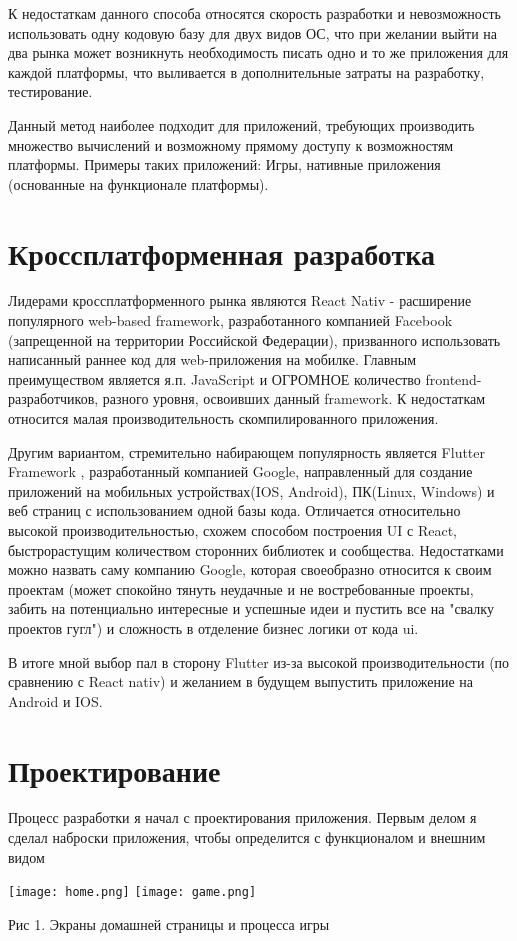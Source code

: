 \documentclass[14pt, oneside]{altsu-report}
\begin{document}
К недостаткам данного способа относятся скорость разработки и невозможность использовать одну кодовую базу для двух видов ОС, что при желании выйти на два рынка может возникнуть необходимость писать одно и то же приложения для каждой платформы, что выливается в дополнительные затраты на разработку, тестирование.

Данный метод наиболее подходит для приложений, требующих производить множество вычислений и возможному прямому доступу к возможностям платформы. Примеры таких приложений: Игры, нативные приложения (основанные на функционале платформы).

\section*{Кроссплатформенная разработка}
Лидерами кроссплатформенного рынка являются React Nativ \cite{react} - расширение популярного web-based framework, разработанного компанией Facebook (запрещенной на территории Российской Федерации), призванного использовать написанный раннее код для web-приложения на мобилке. Главным преимуществом является я.п. JavaScript и ОГРОМНОЕ количество frontend-разработчиков, разного уровня, освоивших данный framework. К недостаткам относится малая производительность скомпилированного приложения. 

Другим вариантом, стремительно набирающем популярность является Flutter Framework \cite{flutter}, разработанный компанией Google, направленный для создание приложений на мобильных устройствах(IOS, Android), ПК(Linux, Windows) и веб страниц с использованием одной базы кода. Отличается относительно высокой производительностью, схожем способом построения UI с React, быстрорастущим количеством сторонних библиотек и сообщества. Недостатками можно назвать саму компанию Google, которая своеобразно относится к своим проектам (может спокойно тянуть неудачные и не востребованные проекты, забить на потенциально интересные и успешные идеи и пустить все на "свалку проектов гугл") и сложность в отделение бизнес логики от кода ui.

В итоге мной выбор пал в сторону Flutter из-за высокой производительности (по сравнению с React nativ) и желанием в будущем выпустить приложение на Android и IOS.
\section{Проектирование}
Процесс разработки я начал с проектирования приложения. Первым делом я сделал наброски приложения, чтобы определится с функционалом и внешним видом\\
\begin{center}
\texttt{[image: home.png]}
\hspace{10pt}
\texttt{[image: game.png]}

   Рис 1. Экраны домашней страницы и процесса игры
\end{center}
\end{document}
